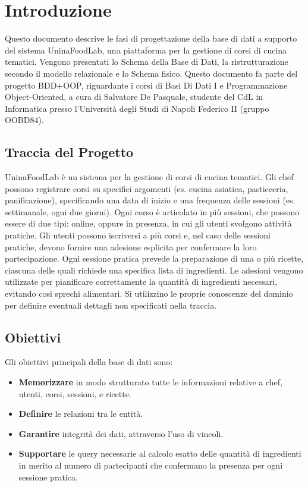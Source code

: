 \documentclass[a4paper, 12pt]{article}
\begin{document}
\newpage

\tableofcontents

\newpage

\section{Introduzione}
    Questo documento descrive le fasi di progettazione della base di dati a supporto del sistema UninaFoodLab, una piattaforma per la gestione di corsi di cucina tematici. Vengono presentati lo Schema della Base di Dati, la ristrutturazione secondo il modello relazionale e lo Schema fisico. Questo documento fa parte del progetto BDD+OOP, riguardante i corsi di Basi Di Dati I e Programmazione Object-Oriented, a cura di Salvatore De Pasquale, studente del CdL in Informatica presso l'Università degli Studi di Napoli Federico II (gruppo OOBD84).

    \subsection{Traccia del Progetto}
    UninaFoodLab è un sistema per la gestione di corsi di cucina tematici. Gli chef possono registrare corsi su specifici argomenti (es. cucina asiatica, pasticceria, panificazione), specificando una data di inizio e una frequenza delle sessioni (es. settimanale, ogni due giorni). Ogni corso è articolato in più sessioni, che possono essere di due tipi: online, oppure in presenza, in cui gli utenti svolgono attività pratiche. Gli utenti possono iscriversi a più corsi e, nel caso delle sessioni pratiche, devono fornire una adesione esplicita per confermare la loro partecipazione. Ogni sessione pratica prevede la preparazione di una o più ricette, ciascuna delle quali richiede una specifica lista di ingredienti. Le adesioni vengono utilizzate per pianificare correttamente la quantità di ingredienti necessari, evitando cosi sprechi alimentari. Si utilizzino le proprie conoscenze del dominio per definire eventuali dettagli non specificati nella traccia.

    \subsection{Obiettivi}
    Gli obiettivi principali della base di dati sono:
    \begin{itemize}
        \item \textbf{Memorizzare} in modo strutturato tutte le informazioni relative a chef, utenti, corsi, sessioni, e ricette.
        \item \textbf{Definire} le relazioni tra le entità.
        \item \textbf{Garantire} integrità dei dati, attraverso l'uso di vincoli.
        \item \textbf{Supportare} le query necessarie al calcolo esatto delle quantità di ingredienti in merito al numero di partecipanti che confermano la presenza per ogni sessione pratica.
    \end{itemize}
  
\end{document}
